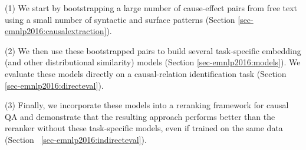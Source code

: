 {\flushleft (1)} We start by bootstrapping a large number of cause-effect pairs from free text using a small number of syntactic and surface patterns (Section \ref{sec-emnlp2016:causalextraction}).

{\flushleft (2)} We then use these bootstrapped pairs to build several task-specific embedding (and other distributional similarity) models (Section \ref{sec-emnlp2016:models}). We evaluate these models directly on a causal-relation identification task (Section \ref{sec-emnlp2016:directeval}).  

{\flushleft (3)} Finally, we incorporate these models into a reranking framework for causal QA and demonstrate that the resulting approach performs better than the reranker without these task-specific models, even if trained on the same data (Section ~\ref{sec-emnlp2016:indirecteval}).  





